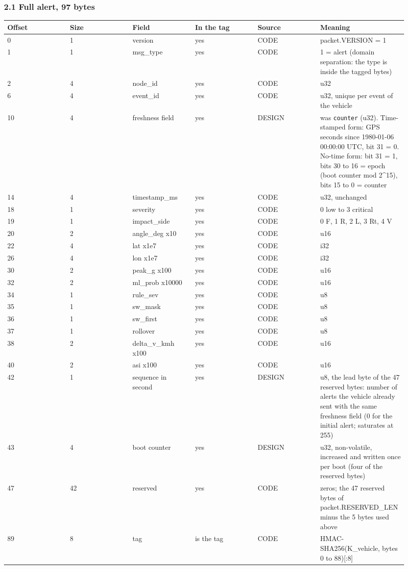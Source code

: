 \subsubsection*{2.1 Full alert, 97 bytes}

{\scriptsize\raggedright
\begin{longtable}{p{0.158\linewidth}p{0.158\linewidth}p{0.158\linewidth}p{0.158\linewidth}p{0.158\linewidth}p{0.158\linewidth}}
\toprule
Offset & Size & Field & In the tag & Source & Meaning \\
\midrule
\endhead
0 & 1 & version & yes & CODE & packet.VERSION = 1 \\
1 & 1 & msg\_type & yes & CODE & 1 = alert (domain separation: the type is inside the tagged bytes) \\
2 & 4 & node\_id & yes & CODE & u32 \\
6 & 4 & event\_id & yes & CODE & u32, unique per event of the vehicle \\
10 & 4 & freshness field & yes & DESIGN & was \texttt{counter} (u32). Time-stamped form: GPS seconds since 1980-01-06 00:00:00 UTC, bit 31 = 0. No-time form: bit 31 = 1, bits 30 to 16 = epoch (boot counter mod 2\textasciicircum{}15), bits 15 to 0 = counter \\
14 & 4 & timestamp\_ms & yes & CODE & u32, unchanged \\
18 & 1 & severity & yes & CODE & 0 low to 3 critical \\
19 & 1 & impact\_side & yes & CODE & 0 F, 1 R, 2 L, 3 Rt, 4 V \\
20 & 2 & angle\_deg x10 & yes & CODE & u16 \\
22 & 4 & lat x1e7 & yes & CODE & i32 \\
26 & 4 & lon x1e7 & yes & CODE & i32 \\
30 & 2 & peak\_g x100 & yes & CODE & u16 \\
32 & 2 & ml\_prob x10000 & yes & CODE & u16 \\
34 & 1 & rule\_sev & yes & CODE & u8 \\
35 & 1 & sw\_mask & yes & CODE & u8 \\
36 & 1 & sw\_first & yes & CODE & u8 \\
37 & 1 & rollover & yes & CODE & u8 \\
38 & 2 & delta\_v\_kmh x100 & yes & CODE & u16 \\
40 & 2 & asi x100 & yes & CODE & u16 \\
42 & 1 & sequence in second & yes & DESIGN & u8, the lead byte of the 47 reserved bytes: number of alerts the vehicle already sent with the same freshness field (0 for the initial alert; saturates at 255) \\
43 & 4 & boot counter & yes & DESIGN & u32, non-volatile, increased and written once per boot (four of the reserved bytes) \\
47 & 42 & reserved & yes & CODE & zeros; the 47 reserved bytes of packet.RESERVED\_LEN minus the 5 bytes used above \\
89 & 8 & tag & is the tag & CODE & HMAC-SHA256(K\_vehicle, bytes 0 to 88)[:8] \\
\bottomrule
\end{longtable}}


